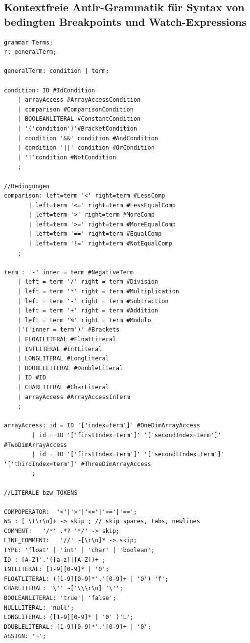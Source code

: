 \documentclass[parskip=full]{scrartcl}
\begin{document}
\subsection{Kontextfreie Antlr-Grammatik für Syntax von bedingten Breakpoints und Watch-Expressions} \label{breakpointgrammatik}
\begin{verbatim}
grammar Terms;
r: generalTerm;

generalTerm: condition | term;

condition: ID #IdCondition
	| arrayAccess #ArrayAccessCondition
	| comparison #ComparisonCondition
	| BOOLEANLITERAL #ConstantCondition
	| '('condition')'#BracketCondition
	| condition '&&' condition #AndCondition
	| condition '||' condition #OrCondition
	| '!'condition #NotCondition
	;
	
//Bedingungen
comparison: left=term '<' right=term #LessComp
	   | left=term '<=' right=term #LessEqualComp
	   | left=term '>' right=term #MoreComp
	   | left=term '>=' right=term #MoreEqualComp
	   | left=term '==' right=term #EqualComp
	   | left=term '!=' right=term #NotEqualComp
	;

term : '-' inner = term #NegativeTerm
    | left = term '/' right = term #Division
	| left = term '*' right = term #Multiplication
	| left = term '-' right = term #Subtraction
	| left = term '+' right = term #Addition
	| left = term '%' right = term #Modulo
	|'('inner = term')' #Brackets
	| FLOATLITERAL #FloatLiteral
	| INTLITERAL #IntLiteral
	| LONGLITERAL #LongLiteral
	| DOUBLELITERAL #DoubleLiteral
	| ID #ID
	| CHARLITERAL #CharLiteral
	| arrayAccess #ArrayAccessInTerm
	;

arrayAccess: id = ID '['index=term']' #OneDimArrayAccess
		| id = ID '['firstIndex=term']' '['secondIndex=term']' #TwoDimArrayAccess
		| id = ID '['firstIndex=term']' '['secondtIndex=term']' '['thirdIndex=term']' #ThreeDimArrayAccess
		;

//LITERALE bzw TOKENS

COMPOPERATOR:  '<'|'>'|'<='|'>='|'==';
WS : [ \t\r\n]+ -> skip ; // skip spaces, tabs, newlines
COMMENT:   '/*' .*? '*/' -> skip;
LINE_COMMENT:   '//' ~[\r\n]* -> skip;
TYPE: 'float' | 'int' | 'char' | 'boolean';
ID : [A-Z]'.'([a-z]|[A-Z])+ ;
INTLITERAL: [1-9][0-9]* | '0';
FLOATLITERAL: ([1-9][0-9]*'.'[0-9]+ | '0') 'f';
CHARLITERAL: '\'' ~['\\\r\n] '\'';
BOOLEANLITERAL:	'true'|	'false';
NULLLITERAL: 'null';
LONGLITERAL: ([1-9][0-9]* | '0' )'L';
DOUBLELITERAL: [1-9][0-9]*'.'[0-9]+ | '0';
ASSIGN: '=';

\end{verbatim}
\end{document}
